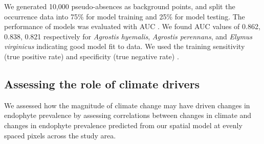 \documentclass[11pt]{article}
\newcommand{\firstrevise}[1]{{\color{black}{#1}}}
\begin{document}
We generated 10,000 pseudo-absences as background points, and split the occurrence data into 75\% for model training and 25\% for model testing.
The performance of models was evaluated with AUC \citep{jimenez2012insights}. 
We found AUC values of 0.862, 0.838, 0.821 respectively  for \emph{Agrostis hyemalis}, \emph{Agrostis perennans}, and \emph{Elymus virginicus} indicating good model fit to data.
We used the training sensitivity (true positive rate) and specificity (true negative rate) \firstrevise{to set a threshold for transforming the continuous predicted probabilities into binary presence - absence host distribution maps on which we projected INLA predictions of endophyte prevalence} \citep{liu2005selecting}.


\subsection*{Assessing the role of climate drivers}
We assessed how the magnitude of climate change may have driven changes in endophyte prevalence by assessing correlations between changes in climate and changes in endophyte prevalence predicted from our spatial model at evenly spaced pixels across the study area.
\end{document}

